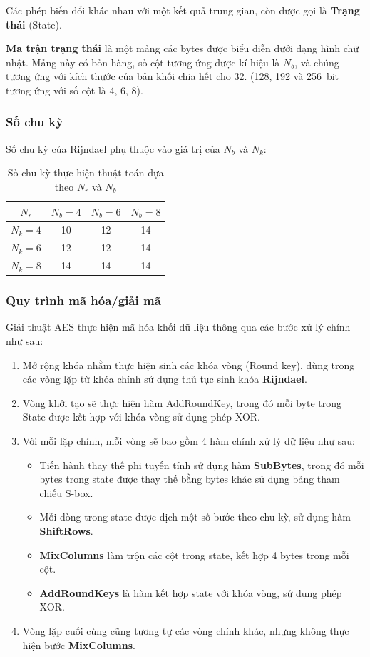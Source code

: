 Các phép biến đổi khác nhau với một kết quả trung gian, còn được gọi là \textbf{Trạng thái} (State).

\textbf{Ma trận trạng thái} là một mảng các bytes được biểu diễn dưới dạng hình chữ nhật. Mảng này có bốn hàng, số cột tương ứng được kí hiệu là $N_b$, và chúng tương ứng với kích thước của bản khối chia hết cho 32. (128, 192 và 256~bit tương ứng với số cột là 4, 6, 8). \nocite{Daemen:2002:DRA}

\subsubsection{Số chu kỳ}
Số chu kỳ của Rijndael phụ thuộc vào giá trị của $N_b$ và $N_k$:
\begin{table}[h]
	\centering
	\caption{Số chu kỳ thực hiện thuật toán dựa theo $N_r$ và $N_b$}
	\begin{tabular}{|c|c|c|c|}
		\hline
		$N_r$ & $N_b = 4$ & $N_b = 6$ & $N_b = 8$ \\ \hline
		$N_k = 4$ & 10 & 12 & 14 \\ \hline
		$N_k = 6$ & 12 & 12 & 14 \\ \hline
		$N_k = 8$ & 14 & 14 & 14 \\ \hline
	\end{tabular}
\end{table}

\subsubsection{Quy trình mã hóa/giải mã}

Giải thuật AES thực hiện mã hóa khối dữ liệu thông qua các bước xử lý chính như sau:

\begin{enumerate}[label= \textbf{Bước \arabic*:}]
	\item Mở rộng khóa nhằm thực hiện sinh các khóa vòng (Round key), dùng trong các vòng lặp từ khóa chính sử dụng thủ tục sinh khóa \textbf{Rijndael}.
	\item Vòng khởi tạo sẽ thực hiện hàm AddRoundKey, trong đó mỗi byte trong State được kết hợp với khóa vòng sử dụng phép XOR.
	\item Với mỗi lặp chính, mỗi vòng sẽ bao gồm 4 hàm chính xử lý dữ liệu như sau:
	\begin{itemize}
		\item Tiến hành thay thế phi tuyến tính sử dụng hàm \textbf{SubBytes}, trong đó mỗi bytes trong state được thay thế bằng bytes khác sử dụng bảng tham chiếu S-box.

		\item Mỗi dòng trong state được dịch một số bước theo chu kỳ, sử dụng hàm \textbf{ShiftRows}.
		\item \textbf{MixColumns} làm trộn các cột trong state, kết hợp 4 bytes trong mỗi cột. 
		\item \textbf{AddRoundKeys} là hàm kết hợp state với khóa vòng, sử dụng phép XOR.
	\end{itemize}
	\item Vòng lặp cuối cùng cũng tương tự các vòng chính khác, nhưng không thực hiện bước \textbf{MixColumns}.
\end{enumerate}

